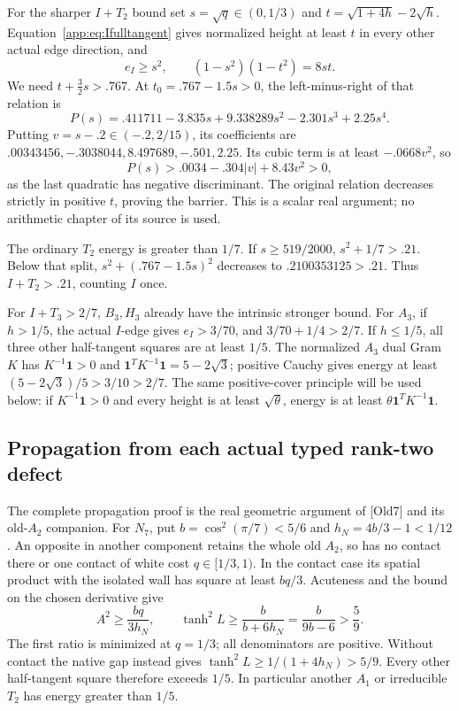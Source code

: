 \documentclass[11pt]{article}
\theoremstyle{definition}
\theoremstyle{remark}
\newcommand{\src}[1]{\textnormal{\textsf{[#1]}}}
\begin{document}
For the sharper \(I+T_2\) bound set \(s=\sqrt q\in(0,1/3)\)
and \(t=\sqrt{1+4h}-2\sqrt h\).
Equation~\eqref{app:eq:Ifulltangent} gives normalized height
at least \(t\) in every other actual edge direction, and
\[
 e_I\geq s^2,\qquad(1-s^2)(1-t^2)=8st.
\]
We need \(t+\tfrac32s>.767\).
At \(t_0=.767-1.5s>0\), the left-minus-right of that relation is
\[
 P(s)=.411711-3.835s+9.338289s^2-2.301s^3+2.25s^4.
\]
Putting \(v=s-.2\in(-.2,2/15)\), its coefficients are
\(.00343456,-.3038044,8.497689,-.501,2.25\).
Its cubic term is at least \(-.0668v^2\), so
\[
 P(s)>.0034-.304|v|+8.43v^2>0,
\]
as the last quadratic has negative discriminant.
The original relation decreases strictly in positive \(t\),
proving the barrier. This is a scalar real argument; no
arithmetic chapter of its source is used.

The ordinary \(T_2\) energy is greater than \(1/7\).
If \(s\geq519/2000\), \(s^2+1/7>.21\).
Below that split, \(s^2+(.767-1.5s)^2\) decreases to
\(.2100353125>.21\). Thus \(I+T_2>.21\), counting \(I\) once.

For \(I+T_3>2/7\), \(B_3,H_3\) already have the intrinsic
stronger bound. For \(A_3\), if \(h>1/5\), the actual
\(I\)-edge gives \(e_I>3/70\), and
\(3/70+1/4>2/7\).
If \(h\leq1/5\), all three other half-tangent squares are
at least \(1/5\). The normalized \(A_3\) dual Gram \(K\)
has \(K^{-1}\mathbf1>0\) and
\(\mathbf1^TK^{-1}\mathbf1=5-2\sqrt3\);
positive Cauchy gives energy at least
\((5-2\sqrt3)/5>3/10>2/7\).
The same positive-cover principle will be used below:
if \(K^{-1}\mathbf1>0\) and every height is at least
\(\sqrt\theta\), energy is at least
\(\theta\mathbf1^TK^{-1}\mathbf1\).

\subsection{Propagation from each actual typed rank-two defect}
\label{app:typedpropagation}
The complete propagation proof is the real geometric argument of \src{Old7}
and its old-\(A_2\) companion.
For \(N_7\), put \(b=\cos^2(\pi/7)<5/6\) and
\(h_N=4b/3-1<1/12\).
An opposite in another component retains the whole old
\(A_2\), so has no contact there or one contact of white
cost \(q\in[1/3,1)\).
In the contact case its spatial product with the isolated
wall has square at least \(bq/3\).
Acuteness and the bound on the chosen derivative give
\[
 A^2\geq\frac{bq}{3h_N},\qquad
 \tanh^2L\geq\frac{b}{b+6h_N}
             =\frac{b}{9b-6}>\frac59.
\]
The first ratio is minimized at \(q=1/3\); all denominators
are positive. Without contact the native gap instead gives
\(\tanh^2L\geq1/(1+4h_N)>5/9\).
Every other half-tangent square therefore exceeds \(1/5\).
In particular another \(A_1\) or irreducible \(T_2\) has
energy greater than \(1/5\).
\end{document}
